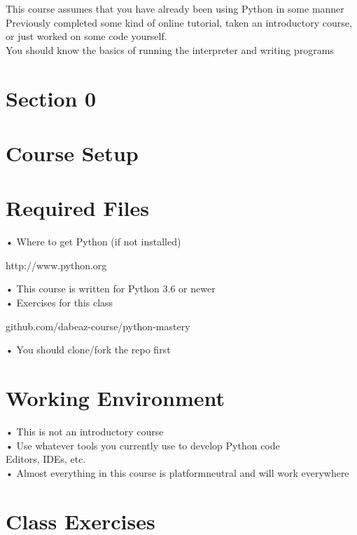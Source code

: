\documentclass[
  letterpaper,
  DIV=11,
  numbers=noendperiod]{scrreprt}
\begin{document}
This course assumes that you have already been using Python in some
manner\\
Previously completed some kind of online tutorial, taken an introductory
course, or just worked on some code yourself.\\
You should know the basics of running the interpreter and writing
programs


\chapter{Section 0}\label{section-0}


\chapter{Course Setup}\label{course-setup}


\chapter{Required Files}\label{required-files}

• Where to get Python (if not installed)

http://www.python.org

• This course is written for Python 3.6 or newer\\
• Exercises for this class

github.com/dabeaz-course/python-mastery

• You should clone/fork the repo first


\chapter{Working Environment}\label{working-environment}

• This is not an introductory course\\
• Use whatever tools you currently use to develop Python code\\
Editors, IDEs, etc.\\
• Almost everything in this course is platformneutral and will work
everywhere


\chapter{Class Exercises}\label{class-exercises}
\end{document}
